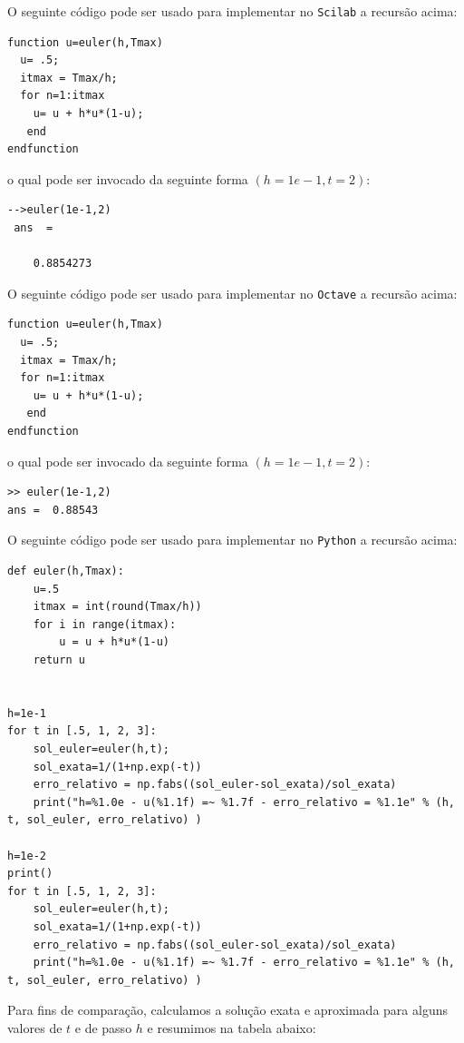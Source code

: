 \ifisscilab
O seguinte código pode ser usado para implementar no \verb+Scilab+ a recursão acima:
\begin{verbatim}
function u=euler(h,Tmax)
  u= .5;
  itmax = Tmax/h;
  for n=1:itmax
    u= u + h*u*(1-u);
   end
endfunction
\end{verbatim}
o qual pode ser invocado da seguinte forma $\left(h=1e-1, t=2\right)$:
\begin{verbatim}
-->euler(1e-1,2)
 ans  =

    0.8854273
\end{verbatim}

\fi

\ifisoctave
O seguinte código pode ser usado para implementar no \verb+Octave+ a recursão acima:
\begin{verbatim}
function u=euler(h,Tmax)
  u= .5;
  itmax = Tmax/h;
  for n=1:itmax
    u= u + h*u*(1-u);
   end
endfunction
\end{verbatim}
o qual pode ser invocado da seguinte forma $\left(h=1e-1, t=2\right)$:
\begin{verbatim}
>> euler(1e-1,2)
ans =  0.88543
\end{verbatim}
\fi


\ifispython
O seguinte código pode ser usado para implementar no \verb+Python+ a recursão acima:

\begin{verbatim}
def euler(h,Tmax):
	u=.5
  	itmax = int(round(Tmax/h))
	for i in range(itmax):
		u = u + h*u*(1-u)
	return u


h=1e-1
for t in [.5, 1, 2, 3]:
	sol_euler=euler(h,t);
	sol_exata=1/(1+np.exp(-t))
	erro_relativo = np.fabs((sol_euler-sol_exata)/sol_exata)
	print("h=%1.0e - u(%1.1f) =~ %1.7f - erro_relativo = %1.1e" % (h, t, sol_euler, erro_relativo) )

h=1e-2
print()
for t in [.5, 1, 2, 3]:
	sol_euler=euler(h,t);
	sol_exata=1/(1+np.exp(-t))
	erro_relativo = np.fabs((sol_euler-sol_exata)/sol_exata)
	print("h=%1.0e - u(%1.1f) =~ %1.7f - erro_relativo = %1.1e" % (h, t, sol_euler, erro_relativo) )

\end{verbatim}
\fi
Para fins de comparação, calculamos a solução exata e aproximada para alguns valores de $t$ e de passo $h$ e resumimos na tabela abaixo:

